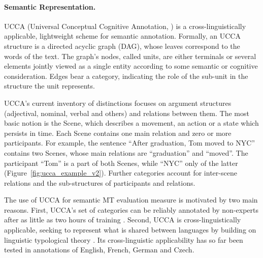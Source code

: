 \documentclass[11pt,letterpaper]{article}
\newcommand{\figref}[1]{Figure~\ref{#1}}
\def\parcite#1{\cite{#1}}
\def\inparcite#1{\cite{#1}}
\begin{document}
\paragraph{Semantic Representation.}
UCCA (Universal Conceptual Cognitive Annotation, \inparcite{abend2013universal}) is a
cross-linguistically applicable, lightweight
scheme for semantic annotation. Formally, an UCCA structure is a directed acyclic graph (DAG),
whose leaves correspond to the words of the text.
The graph's nodes, called {\sc units}, are either terminals or several elements jointly
viewed as a single entity according to some semantic or cognitive consideration. Edges bear
a category, indicating the role of the sub-unit in the structure the unit
represents.

UCCA's current inventory of distinctions focuses on argument structures
(adjectival, nominal, verbal and others) and relations between them.
The most basic notion is the Scene, which describes a movement, an
action or a state which persists in time. Each Scene contains one main
relation and zero or more participants. For example, the sentence ``After graduation, Tom moved to NYC''
contains two Scenes, whose main relations are ``graduation'' and ``moved''.
The participant ``Tom'' is a part of both Scenes, while ``NYC'' only of the
latter (\figref{fig:ucca_example_v2}). Further categories account for
inter-scene relations and the sub-structures of participants and relations.

The use of UCCA for semantic MT evaluation measure is motivated by two main reasons. 
First, UCCA's set of categories can
be reliably annotated by non-experts after as little as two hours
of training \parcite{marinotti2014}.
Second, UCCA is cross-linguistically applicable, seeking to
represent what is shared between languages by building on
linguistic typological theory \parcite{Dixon:10a,Dixon:10b,Dixon:12}.
Its cross-linguistic applicability has so far been tested in annotations of
English, French, German and Czech.

\end{document}
